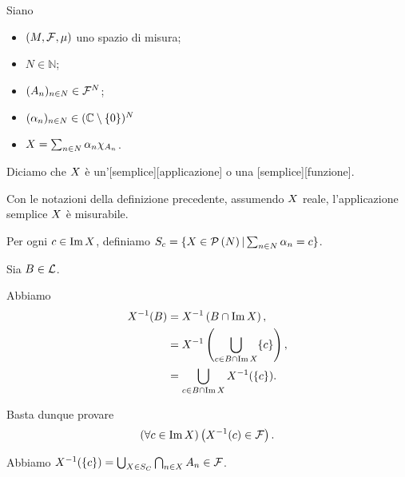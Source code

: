 \begin{Definition}
  Siano
  \begin{itemize}
    \item $(M,\mathcal{F},\mu)$ uno spazio di misura;
    \item $N \in \mathbb{N}$;
    \item $(A_n)_{n \in N} \in \mathcal{F}^N$;
    \item $(\alpha_n)_{n \in N} \in (\mathbb{C} \setminus \lbrace 0 \rbrace)^N$
    \item $X
      = \sum_{n \in N} \alpha_n\chi_{A_n}$.
  \end{itemize}
  Diciamo che $X$ \`e
  un'[semplice][applicazione]
  o
  una [semplice][funzione].
\end{Definition}
\begin{Theorem}
  Con le notazioni della definizione precedente,
  assumendo $X$ reale,
  l'applicazione semplice
  $X$ \`e misurabile.
\end{Theorem}
\Proof Per ogni $c \in \operatorname{Im}{X}$, definiamo
$S_c
= \lbrace X \in \mathcal{P} \left (N \right ) | \sum_{n \in N} \alpha_n = c \rbrace$.
\par Sia $B \in \mathcal{L}$.
\par Abbiamo
\begin{align*}
  X^{-1}(B)
  &= X^{-1}
    \left ( B \cap \operatorname{Im}{X} \right ),\\
  &= X^{-1}
    \left ( \bigcup_{c \in B \cap \operatorname{Im}{X}}
    \lbrace c \rbrace \right ),\\
  &= \bigcup_{c \in B \cap \operatorname{Im}{X}}
    X^{-1}(\lbrace c \rbrace).
\end{align*}
\par Basta dunque provare
\[
  \left ( \forall c \in \operatorname{Im}{X} \right ) \left ( X^{-1}(c) \in \mathcal{F} \right ).
\]
\par Abbiamo
$X^{-1}(\lbrace c \rbrace)
= \bigcup_{X \in S_C} \bigcap_{n \in X} A_n \in \mathcal{F}$.
\EndProof
